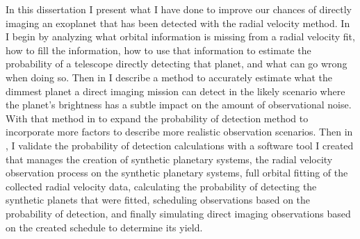 In this dissertation I present what I have done to improve our chances of
directly imaging an exoplanet that has been detected with the radial velocity
method. In  I begin by analyzing what orbital information
is missing from a radial velocity fit, how to fill the information, how to use
that information to estimate the probability of a telescope directly detecting
that planet, and what can go wrong when doing so. Then in  I
describe a method to accurately estimate what the dimmest planet a direct
imaging mission can detect in the likely scenario where the planet's brightness
has a subtle impact on the amount of observational noise. With that method in
 to expand the probability of detection method to
incorporate more factors to describe more realistic observation scenarios. Then
in , I validate the probability of detection
calculations with a software tool I created that manages the creation of
synthetic planetary systems, the radial velocity observation process on the
synthetic planetary systems, full orbital fitting of the collected radial
velocity data, calculating the probability of detecting the synthetic planets
that were fitted, scheduling observations based on the probability of
detection, and finally simulating direct imaging observations based on the
created schedule to determine its yield.


